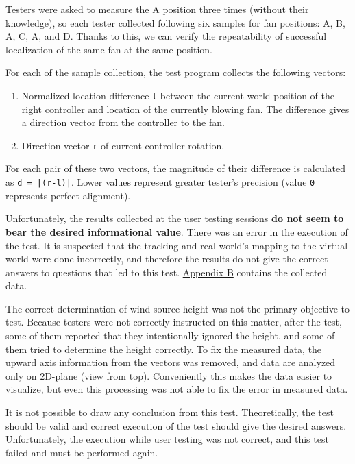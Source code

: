 Testers were asked to measure the A position three times (without their knowledge),
so each tester collected following six samples for fan positions: A, B, A, C,
A, and D. Thanks to this, we can verify the repeatability of successful
localization of the same fan at the same position.


For each of the sample collection, the test program collects the following vectors:


\begin{enumerate}

\item{Normalized location difference \texttt{l} between the current world position of the right
controller and location of the currently blowing fan. The difference gives a direction
vector from the controller to the fan.}

\item{Direction vector \texttt{r} of current controller rotation.}

\end{enumerate}


For each pair of these two vectors, the magnitude of their difference is calculated
as \texttt{d = |(r-l)|}.
Lower values represent greater tester’s precision (value \texttt{0} represents
perfect alignment).



Unfortunately, the results collected at the user testing sessions
\textbf{do not seem to bear the desired informational value}.
There was an error in the execution of the test. It is suspected that
the tracking and real world’s mapping to the virtual world were done
incorrectly, and therefore the results do not give the correct answers to
questions that led to this test. \hyperref[appx:b]{Appendix B}
contains the collected data.


The correct determination of wind source height was not the primary
objective to test. Because testers were not correctly instructed on this matter,
after the test, some of them reported that they intentionally ignored the
height, and some of them tried to determine the height correctly.
To fix the measured data, the upward axis information from the vectors was
removed, and data are analyzed only on 2D-plane (view from top).
Conveniently this makes the data easier to visualize, but even this
processing was not able to fix the error in measured data.


It is not possible to draw any conclusion from this test. Theoretically, the
test should be valid and correct execution of the test should give the
desired answers. Unfortunately, the execution while user testing was not
correct, and this test failed and must be performed again.


